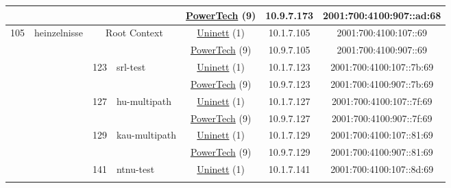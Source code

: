 \begin{small}
\begin{center}
\begin{longtable}{|c|c|c|c|c|c|c|c|}
  &  &  &  & \multicolumn{2}{|c|}{\tiny{\href{http://www.powertech.no}{PowerTech} (9)}} & \tiny{10.9.7.173} & \tiny{2001:700:4100:907::ad:68} \\ \hline
 \multirow{16}{*}{\tiny{105}} & \multicolumn{1}{|l|}{\multirow{16}{*}{\tiny{heinzelnisse}}} & \multicolumn{2}{|c|}{\multirow{2}{*}{\tiny{Root Context}}} & \multicolumn{2}{|c|}{\tiny{\href{https://www.uninett.no}{Uninett} (1)}} & \tiny{10.1.7.105} & \tiny{2001:700:4100:107::69} \\* \cline{5-5}\cline{6-6}\cline{7-7}\cline{8-8}
  &  & \multicolumn{2}{|c|}{} & \multicolumn{2}{|c|}{\tiny{\href{http://www.powertech.no}{PowerTech} (9)}} & \tiny{10.9.7.105} & \tiny{2001:700:4100:907::69} \\* \cline{3-3}\cline{4-4}\cline{5-5}\cline{6-6}\cline{7-7}\cline{8-8}
  &  & \multirow{2}{*}{\tiny{123}} & \multicolumn{1}{|l|}{\multirow{2}{*}{\tiny{srl-test}}} & \multicolumn{2}{|c|}{\tiny{\href{https://www.uninett.no}{Uninett} (1)}} & \tiny{10.1.7.123} & \tiny{2001:700:4100:107::7b:69} \\* \cline{5-5}\cline{6-6}\cline{7-7}\cline{8-8}
  &  &  &  & \multicolumn{2}{|c|}{\tiny{\href{http://www.powertech.no}{PowerTech} (9)}} & \tiny{10.9.7.123} & \tiny{2001:700:4100:907::7b:69} \\* \cline{3-3}\cline{4-4}\cline{5-5}\cline{6-6}\cline{7-7}\cline{8-8}
  &  & \multirow{2}{*}{\tiny{127}} & \multicolumn{1}{|l|}{\multirow{2}{*}{\tiny{hu-multipath}}} & \multicolumn{2}{|c|}{\tiny{\href{https://www.uninett.no}{Uninett} (1)}} & \tiny{10.1.7.127} & \tiny{2001:700:4100:107::7f:69} \\* \cline{5-5}\cline{6-6}\cline{7-7}\cline{8-8}
  &  &  &  & \multicolumn{2}{|c|}{\tiny{\href{http://www.powertech.no}{PowerTech} (9)}} & \tiny{10.9.7.127} & \tiny{2001:700:4100:907::7f:69} \\* \cline{3-3}\cline{4-4}\cline{5-5}\cline{6-6}\cline{7-7}\cline{8-8}
  &  & \multirow{2}{*}{\tiny{129}} & \multicolumn{1}{|l|}{\multirow{2}{*}{\tiny{kau-multipath}}} & \multicolumn{2}{|c|}{\tiny{\href{https://www.uninett.no}{Uninett} (1)}} & \tiny{10.1.7.129} & \tiny{2001:700:4100:107::81:69} \\* \cline{5-5}\cline{6-6}\cline{7-7}\cline{8-8}
  &  &  &  & \multicolumn{2}{|c|}{\tiny{\href{http://www.powertech.no}{PowerTech} (9)}} & \tiny{10.9.7.129} & \tiny{2001:700:4100:907::81:69} \\* \cline{3-3}\cline{4-4}\cline{5-5}\cline{6-6}\cline{7-7}\cline{8-8}
  &  & \multirow{2}{*}{\tiny{141}} & \multicolumn{1}{|l|}{\multirow{2}{*}{\tiny{ntnu-test}}} & \multicolumn{2}{|c|}{\tiny{\href{https://www.uninett.no}{Uninett} (1)}} & \tiny{10.1.7.141} & \tiny{2001:700:4100:107::8d:69} \\* \cline{5-5}\cline{6-6}\cline{7-7}\cline{8-8}

\end{longtable}
\end{center}
\end{small}
